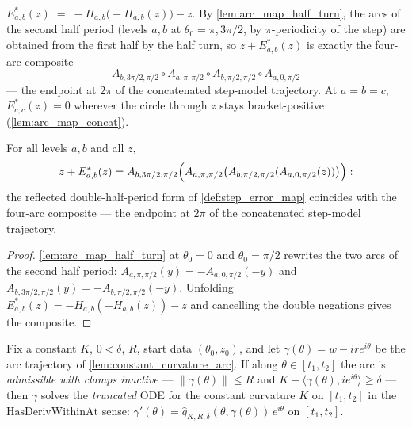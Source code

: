 \begin{definition}
  \label{def:step_error_map}
  $E^\ast_{a,b}(z)\;=\;-H_{a,b}\bigl(-H_{a,b}(z)\bigr)-z$. By
  \cref{lem:arc_map_half_turn}, the arcs of the second half period (levels $a,b$ at
  $\theta_0=\pi,3\pi/2$, by $\pi$-periodicity of the step) are obtained from the first
  half by the half turn, so $z+E^\ast_{a,b}(z)$ is exactly the four-arc composite
  \[
    A_{b,3\pi/2,\pi/2}\circ A_{a,\pi,\pi/2}\circ A_{b,\pi/2,\pi/2}\circ A_{a,0,\pi/2}
  \]
  — the endpoint at $2\pi$ of the concatenated step-model trajectory. At $a=b=c$,
  $E^\ast_{c,c}(z)=0$ wherever the circle through $z$ stays bracket-positive
  (\cref{lem:arc_map_concat}).
\end{definition}

\begin{lemma}
  \label{lem:step_error_map_four_arc}
  For all levels $a,b$ and all $z$,
  \[
    z+E^\ast_{a,b}(z)
    =A_{b,3\pi/2,\pi/2}\Bigl(A_{a,\pi,\pi/2}\bigl(A_{b,\pi/2,\pi/2}(A_{a,0,\pi/2}(z))
    \bigr)\Bigr) :
  \]
  the reflected double-half-period form of \cref{def:step_error_map} coincides with
  the four-arc composite — the endpoint at $2\pi$ of the concatenated step-model
  trajectory.
\end{lemma}

\begin{proof}
  \leanok
  \cref{lem:arc_map_half_turn} at $\theta_0=0$ and $\theta_0=\pi/2$ rewrites the two
  arcs of the second half period: $A_{a,\pi,\pi/2}(y)=-A_{a,0,\pi/2}(-y)$ and
  $A_{b,3\pi/2,\pi/2}(y)=-A_{b,\pi/2,\pi/2}(-y)$. Unfolding
  $E^\ast_{a,b}(z)=-H_{a,b}(-H_{a,b}(z))-z$ and cancelling the double negations gives
  the composite.
\end{proof}

\begin{lemma}
  \label{lem:constant_arc_solves_truncated}
  Fix a constant $K$, $0<\delta$, $R$, start data $(\theta_0,z_0)$, and let
  $\gamma(\theta)=w-ire^{i\theta}$ be the arc trajectory of \cref{lem:constant_curvature_arc}.
  If along $\theta\in[t_1,t_2]$ the arc is \emph{admissible with clamps inactive} —
  $\|\gamma(\theta)\|\le R$ and $K-\langle \gamma(\theta),ie^{i\theta}\rangle\ge\delta$ — then $\gamma$
  solves the \emph{truncated} ODE for the constant curvature $K$ on $[t_1,t_2]$ in the
  $\mathrm{HasDerivWithinAt}$ sense:
  $\gamma'(\theta)=\hat q_{K,R,\delta}(\theta,\gamma(\theta))\,e^{i\theta}$ on $[t_1,t_2]$.
\end{lemma}

